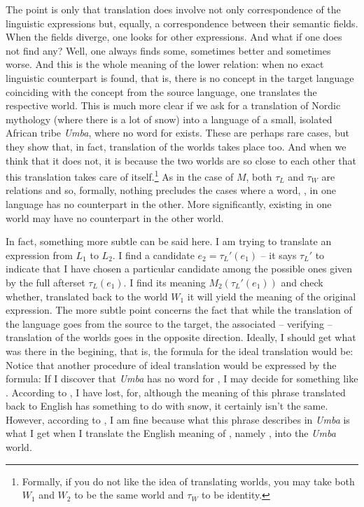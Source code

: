 \documentclass[10pt]{article}
\begin{document}
The point is only that translation does involve not only correspondence of 
the linguistic expressions but, equally, a correspondence between their 
semantic fields. When the fields diverge, one looks for other expressions. 
And what if one does not find any? Well, one always finds some, sometimes 
better and sometimes worse. And this is the whole meaning of the lower 
relation: when no exact linguistic counterpart is found, that is, there is 
no concept in the target language coinciding with the concept from the 
source language, one translates the respective world. This is much more 
clear if we ask for a translation of Nordic mythology (where there is a lot 
of snow) into a language of a small, isolated African tribe {\em Umba}, 
where no word 
for  exists. These are perhaps rare cases, but they show that, 
in fact, translation of the worlds takes place too. And when we think that 
it does not, it is because the two worlds are so close to each other that 
this translation takes care of itself.\footnote{Formally, if you do not 
like the idea of translating worlds, you may take both $W_1$ and $W_2$ to 
be the same world and $\tau_W$ to be identity.}
As in the case of $M$, both $\tau_L$ and $\tau_W$ are relations and so, 
formally, nothing precludes the cases where a word, , in one 
language has no counterpart in the other. More significantly,  
existing in one world may have no counterpart in the other world.

In fact, something more subtle can be said here. I am trying to translate 
an expression  from $L_1$ to $L_2$. I find a candidate 
$e_2=\tau_L'(e_1)$ -- it says $\tau_L'$ to indicate that I 
have chosen a particular candidate among the possible ones given by the 
full afterset $\tau_L(e_1)$. I find its meaning $M_2(\tau_L'({e_1}))$ and 
check whether, translated back to the world $W_1$ it will yield the meaning 
of the original expression. The more subtle point concerns the fact that 
while the translation of the language goes from the source to the target, 
the associated -- verifying -- translation of the worlds goes in the 
opposite direction. Ideally, I should get what was there in the begining, 
that is, the formula for the ideal translation would be:
Notice that another procedure of ideal translation would be expressed by 
the formula:
If I discover that {\em Umba} has no word for , I may decide for 
something like . 
According to , I have lost, for, although the meaning of this 
phrase translated back to English has something to do with snow, it 
certainly isn't the same. However, according to , I am fine 
because what this phrase describes in {\em Umba} is what I get when I 
translate the English meaning of , namely , into 
the {\em Umba} world.
\end{document}
